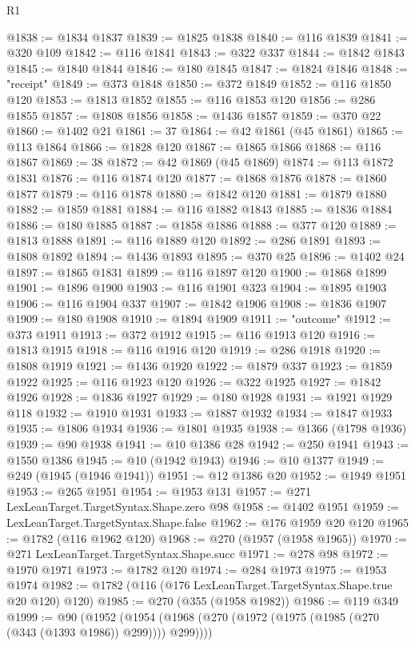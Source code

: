 \begin{lexlean}{R1}
\begin{coremodule}
@1838 := @1834 @1837
@1839 := @1825 @1838
@1840 := @116 @1839
@1841 := @320 @109
@1842 := @116 @1841
@1843 := @322 @337
@1844 := @1842 @1843
@1845 := @1840 @1844
@1846 := @180 @1845
@1847 := @1824 @1846
@1848 := "receipt"
@1849 := @373 @1848
@1850 := @372 @1849
@1852 := @116 @1850 @120
@1853 := @1813 @1852
@1855 := @116 @1853 @120
@1856 := @286 @1855
@1857 := @1808 @1856
@1858 := @1436 @1857
@1859 := @370 @22
@1860 := @1402 @21
@1861 := 37
@1864 := @42 @1861 (@45 @1861)
@1865 := @113 @1864
@1866 := @1828 @120
@1867 := @1865 @1866
@1868 := @116 @1867
@1869 := 38
@1872 := @42 @1869 (@45 @1869)
@1874 := @113 @1872 @1831
@1876 := @116 @1874 @120
@1877 := @1868 @1876
@1878 := @1860 @1877
@1879 := @116 @1878
@1880 := @1842 @120
@1881 := @1879 @1880
@1882 := @1859 @1881
@1884 := @116 @1882 @1843
@1885 := @1836 @1884
@1886 := @180 @1885
@1887 := @1858 @1886
@1888 := @377 @120
@1889 := @1813 @1888
@1891 := @116 @1889 @120
@1892 := @286 @1891
@1893 := @1808 @1892
@1894 := @1436 @1893
@1895 := @370 @25
@1896 := @1402 @24
@1897 := @1865 @1831
@1899 := @116 @1897 @120
@1900 := @1868 @1899
@1901 := @1896 @1900
@1903 := @116 @1901 @323
@1904 := @1895 @1903
@1906 := @116 @1904 @337
@1907 := @1842 @1906
@1908 := @1836 @1907
@1909 := @180 @1908
@1910 := @1894 @1909
@1911 := "outcome"
@1912 := @373 @1911
@1913 := @372 @1912
@1915 := @116 @1913 @120
@1916 := @1813 @1915
@1918 := @116 @1916 @120
@1919 := @286 @1918
@1920 := @1808 @1919
@1921 := @1436 @1920
@1922 := @1879 @337
@1923 := @1859 @1922
@1925 := @116 @1923 @120
@1926 := @322 @1925
@1927 := @1842 @1926
@1928 := @1836 @1927
@1929 := @180 @1928
@1931 := @1921 @1929 @118
@1932 := @1910 @1931
@1933 := @1887 @1932
@1934 := @1847 @1933
@1935 := @1806 @1934
@1936 := @1801 @1935
@1938 := @1366 (@1798 @1936)
@1939 := @90 @1938
@1941 := @10 @1386 @28
@1942 := @250 @1941
@1943 := @1550 @1386
@1945 := @10 (@1942 @1943)
@1946 := @10 @1377
@1949 := @249 (@1945 (@1946 @1941))
@1951 := @12 @1386 @20
@1952 := @1949 @1951
@1953 := @265 @1951
@1954 := @1953 @131
@1957 := @271 LexLeanTarget.TargetSyntax.Shape.zero @98
@1958 := @1402 @1951
@1959 := LexLeanTarget.TargetSyntax.Shape.false
@1962 := @176 @1959 @20 @120
@1965 := @1782 (@116 @1962 @120)
@1968 := @270 (@1957 (@1958 @1965))
@1970 := @271 LexLeanTarget.TargetSyntax.Shape.succ
@1971 := @278 @98
@1972 := @1970 @1971
@1973 := @1782 @120
@1974 := @284 @1973
@1975 := @1953 @1974
@1982 := @1782 (@116 (@176 LexLeanTarget.TargetSyntax.Shape.true @20 @120) @120)
@1985 := @270 (@355 (@1958 @1982))
@1986 := @119 @349
@1999 := @90
    (@1952 (@1954 (@1968 (@270 (@1972 (@1975 (@1985 (@270 (@343 (@1393 @1986)) @299)))) @299))))

\end{coremodule}
\end{lexlean}
